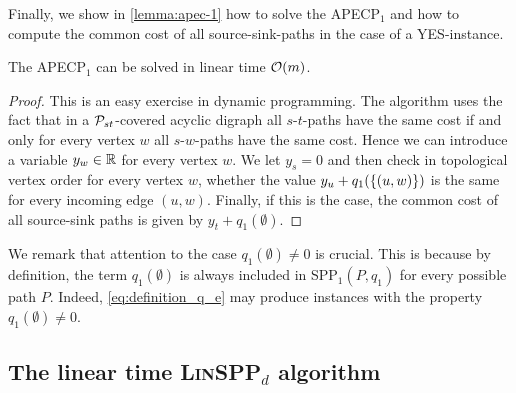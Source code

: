 Finally, we show in %
\cref{lemma:apec-1} 
 how to solve the APECP$_1$ and how to  compute the common cost of all source-sink-paths in the case of a  YES-instance.
\begin{lemma}
\label{lemma:apec-1}
    The APECP$_1$ can be solved in linear time $\mathcal{O}(m)$.
\end{lemma}
\begin{proof}
    This is an easy exercise in dynamic programming. The algorithm uses the fact that in a $\mathcal{P}_{st}$-covered acyclic digraph all $s$-$t$-paths have the same cost if and only for every vertex $w$ all $s$-$w$-paths have the same cost. Hence we can introduce a variable $y_w \in \mathbb{R}$ for every vertex $w$. We let $y_s = 0$ and then check in topological vertex order for every vertex $w$, whether the value $y_u + q_1(\{ (u,w) \})$ is the same for every incoming edge $(u, w)$. Finally, if this is the case, the  common cost of all source-sink paths is given by $y_t + q_1(\emptyset)$.
\end{proof}
 We remark that attention to the case $q_1(\emptyset) \neq 0$ is crucial. This is because by definition, the term $q_1(\emptyset)$ is always included in SPP$_1(P, q_1)$ for every possible path $P$. Indeed, \cref{eq:definition_q_e} may produce instances with the property $q_1(\emptyset) \neq 0$.


\subsection{The linear time \textsc{Lin}SPP$_d$ algorithm}
\label{subsection:alg}

